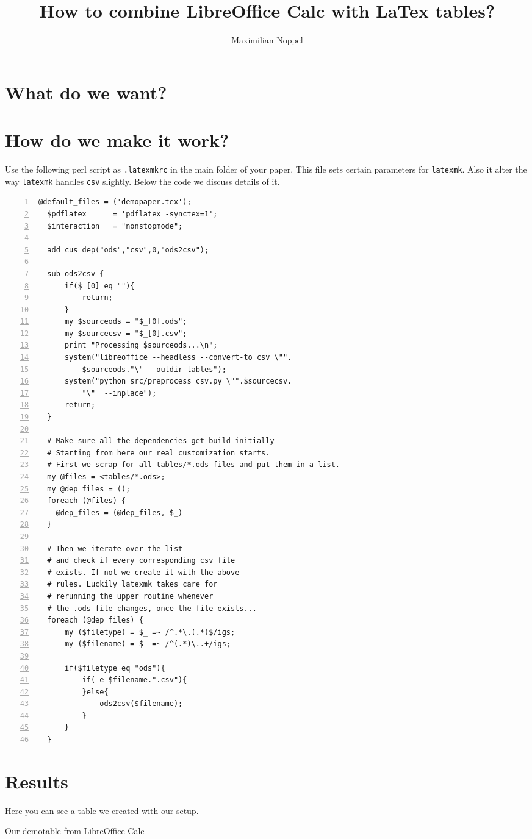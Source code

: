 \documentclass{scrartcl}
\title{How to combine LibreOffice Calc with LaTex tables?}
\author{Maximilian Noppel}
\begin{document}
\maketitle


\section*{What do we want?}

\section*{How do we make it work?}
Use the following perl script as \texttt{.latexmkrc} in the main folder of your paper. 
This file sets certain parameters for \texttt{latexmk}.
Also it alter the way \texttt{latexmk} handles \texttt{csv} slightly.
Below the code we discuss details of it.

\begin{lstlisting}[numbers=left]
  @default_files = ('demopaper.tex');
  $pdflatex      = 'pdflatex -synctex=1';
  $interaction   = "nonstopmode";
  
  add_cus_dep("ods","csv",0,"ods2csv");
  
  sub ods2csv {
      if($_[0] eq ""){
          return;
      }
      my $sourceods = "$_[0].ods";
      my $sourcecsv = "$_[0].csv";
      print "Processing $sourceods...\n";
      system("libreoffice --headless --convert-to csv \"". 
          $sourceods."\" --outdir tables");
      system("python src/preprocess_csv.py \"".$sourcecsv. 
          "\"  --inplace");
      return;
  }
  
  # Make sure all the dependencies get build initially
  # Starting from here our real customization starts.
  # First we scrap for all tables/*.ods files and put them in a list.
  my @files = <tables/*.ods>;
  my @dep_files = ();
  foreach (@files) {
    @dep_files = (@dep_files, $_)
  }
  
  # Then we iterate over the list
  # and check if every corresponding csv file
  # exists. If not we create it with the above
  # rules. Luckily latexmk takes care for 
  # rerunning the upper routine whenever
  # the .ods file changes, once the file exists...
  foreach (@dep_files) {
      my ($filetype) = $_ =~ /^.*\.(.*)$/igs;
      my ($filename) = $_ =~ /^(.*)\..+/igs;
  
      if($filetype eq "ods"){
          if(-e $filename.".csv"){
          }else{
              ods2csv($filename);
          }
      }
  }
\end{lstlisting}

\section*{Results}
Here you can see a table we created with our setup.

\begin{table}[!h]
  \caption{
    Our demotable from LibreOffice Calc
  }
  \label{tab:demotable}
  \centering
  
\end{table}



\end{document}

